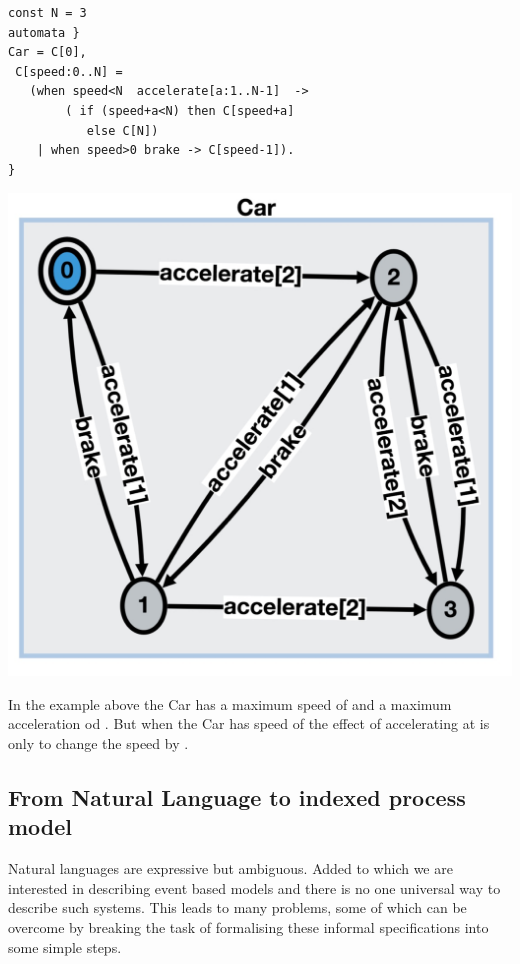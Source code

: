 \documentclass[]{article}
\begin{document}
\begin{minipage}{0.52\textwidth}
\begin{verbatim}
const N = 3
automata }
Car = C[0],
 C[speed:0..N] =
   (when speed<N  accelerate[a:1..N-1]  ->
        ( if (speed+a<N) then C[speed+a]
           else C[N])
    | when speed>0 brake -> C[speed-1]).
}\end{verbatim}
\end{minipage}
\begin{minipage}{0.35\textwidth}
 \includegraphics[scale=0.15]{Car.jpg}
 \end{minipage}

In the example above the {\sf Car} has a maximum speed of {} and a maximum acceleration od {}. But when the {\sf Car} has speed of {} the effect of accelerating at {} is only to change the speed by {}.

 \subsection{From Natural Language to indexed process model}
 Natural languages are expressive but ambiguous.  Added to which we are interested in describing event based models and there is no one universal way to describe such systems. This leads to many problems, some of which can be overcome by breaking the task of formalising these informal specifications into some simple steps.
\end{document}
